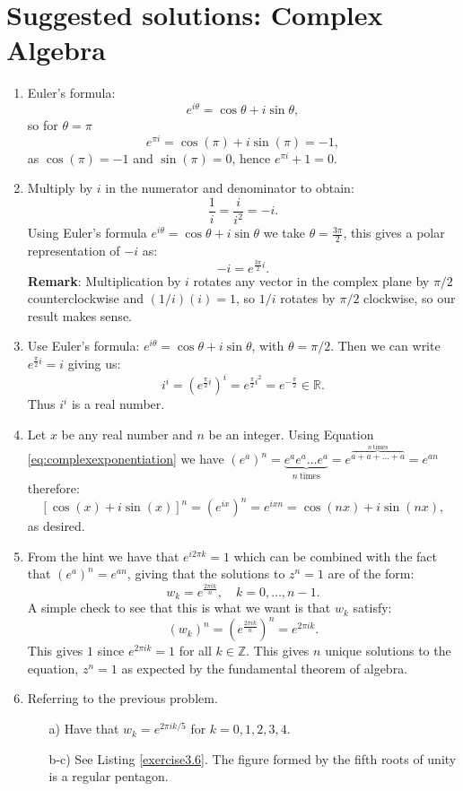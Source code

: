\newpage
\section{Suggested solutions: Complex Algebra}
\begin{enumerate}

\item Euler's formula:
$$e^{i\theta}=\cos\theta+i\sin\theta,$$
so for $\theta=\pi$
$$e^{\pi i}=\cos(\pi)+i\sin(\pi)=-1,$$
as $\cos(\pi)=-1$ and $\sin(\pi)=0$, hence $e^{\pi i}+1=0$. 

\item Multiply by $i$ in the numerator and denominator to obtain:
$$\frac{1}{i}=\frac{i}{i^{2}}=-i.$$
Using Euler's formula $e^{i\theta}=\cos\theta+i\sin\theta$ we take $\theta=\frac{3\pi}{2}$, this gives a polar representation of $-i$ as:
$$-i=e^{\frac{3\pi}{2}i}.$$
\textbf{Remark}: Multiplication by $i$ rotates any vector in the complex plane 
by $\pi/2$ counterclockwise and $(1/i)(i)=1$, so $1/i$ rotates by $\pi/2$ clockwise, so our result makes sense. 

\item Use Euler's formula: $e^{i\theta}=\cos\theta+i\sin\theta$, with $\theta=\pi/2$. Then we can write $e^{\frac{\pi}{2}i}=i$ giving us:
$$i^{i}=(e^{\frac{\pi}{2}i})^{i}=e^{\frac{\pi}{2}i^{2}}=e^{-\frac{\pi}{2}}\in\mathbb{R}.$$
Thus $i^{i}$ is a real number. 

\item Let $x$ be any real number and $n$ be an integer. Using Equation \ref{eq:complexexponentiation} we 
have $(e^{a})^{n}=\underbrace{e^{a}e^{a}\hdots e^{a}}_{n\ \text{times}}=e^{\overbrace{a+a+\hdots+a}^{n\ \text{times}}}=e^{an}$ therefore:
$$[\cos(x)+i\sin(x)]^{n}=(e^{ix})^{n}=e^{ixn}=\cos(nx)+i\sin(nx),$$
as desired. 

\item From the hint we have that $e^{i2\pi k}=1$ which can be combined with 
the fact that $(e^{a})^{n}=e^{an}$, giving that the solutions to $z^{n}=1$ are of the form:
$$w_{k}=e^{\frac{2\pi i k}{n}}, \quad k=0,\hdots,n-1.$$
A simple check to see that this is what we want is that $w_{k}$ satisfy:
$$(w_{k})^{n}=(e^{\frac{2\pi ik}{n}})^{n}=e^{2\pi ik}.$$
This gives $1$ since $e^{2\pi ik}=1$ for all $k\in\mathbb{Z}$. 
This gives $n$ unique solutions to the equation, $z^{n}=1$ as expected by the fundamental theorem of algebra.  

\item Referring to the previous problem.
\begin{itemize}
    \item[a)] Have that $w_{k}=e^{2\pi ik/5}$ for $k=0,1,2,3,4$. 
    \item[b-c)] See Listing \ref{exercise3.6}. The figure formed by the fifth roots of unity is a regular pentagon. 
\end{itemize}


\end{enumerate}
